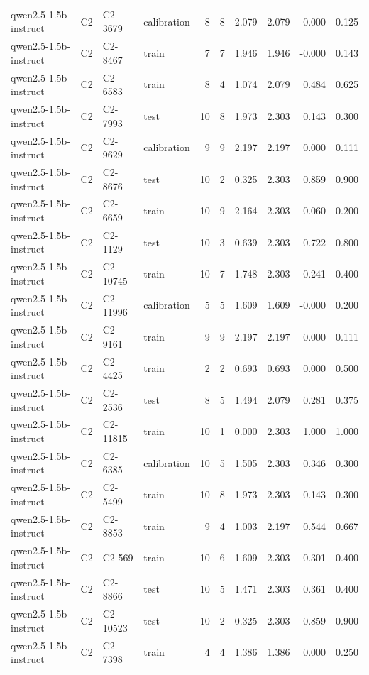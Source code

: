 \begin{table}
\begin{tabular}{llllrrrrrr}
qwen2.5-1.5b-instruct & C2 & C2-3679 & calibration & 8 & 8 & 2.079 & 2.079 & 0.000 & 0.125 \\
qwen2.5-1.5b-instruct & C2 & C2-8467 & train & 7 & 7 & 1.946 & 1.946 & -0.000 & 0.143 \\
qwen2.5-1.5b-instruct & C2 & C2-6583 & train & 8 & 4 & 1.074 & 2.079 & 0.484 & 0.625 \\
qwen2.5-1.5b-instruct & C2 & C2-7993 & test & 10 & 8 & 1.973 & 2.303 & 0.143 & 0.300 \\
qwen2.5-1.5b-instruct & C2 & C2-9629 & calibration & 9 & 9 & 2.197 & 2.197 & 0.000 & 0.111 \\
qwen2.5-1.5b-instruct & C2 & C2-8676 & test & 10 & 2 & 0.325 & 2.303 & 0.859 & 0.900 \\
qwen2.5-1.5b-instruct & C2 & C2-6659 & train & 10 & 9 & 2.164 & 2.303 & 0.060 & 0.200 \\
qwen2.5-1.5b-instruct & C2 & C2-1129 & test & 10 & 3 & 0.639 & 2.303 & 0.722 & 0.800 \\
qwen2.5-1.5b-instruct & C2 & C2-10745 & train & 10 & 7 & 1.748 & 2.303 & 0.241 & 0.400 \\
qwen2.5-1.5b-instruct & C2 & C2-11996 & calibration & 5 & 5 & 1.609 & 1.609 & -0.000 & 0.200 \\
qwen2.5-1.5b-instruct & C2 & C2-9161 & train & 9 & 9 & 2.197 & 2.197 & 0.000 & 0.111 \\
qwen2.5-1.5b-instruct & C2 & C2-4425 & train & 2 & 2 & 0.693 & 0.693 & 0.000 & 0.500 \\
qwen2.5-1.5b-instruct & C2 & C2-2536 & test & 8 & 5 & 1.494 & 2.079 & 0.281 & 0.375 \\
qwen2.5-1.5b-instruct & C2 & C2-11815 & train & 10 & 1 & 0.000 & 2.303 & 1.000 & 1.000 \\
qwen2.5-1.5b-instruct & C2 & C2-6385 & calibration & 10 & 5 & 1.505 & 2.303 & 0.346 & 0.300 \\
qwen2.5-1.5b-instruct & C2 & C2-5499 & train & 10 & 8 & 1.973 & 2.303 & 0.143 & 0.300 \\
qwen2.5-1.5b-instruct & C2 & C2-8853 & train & 9 & 4 & 1.003 & 2.197 & 0.544 & 0.667 \\
qwen2.5-1.5b-instruct & C2 & C2-569 & train & 10 & 6 & 1.609 & 2.303 & 0.301 & 0.400 \\
qwen2.5-1.5b-instruct & C2 & C2-8866 & test & 10 & 5 & 1.471 & 2.303 & 0.361 & 0.400 \\
qwen2.5-1.5b-instruct & C2 & C2-10523 & test & 10 & 2 & 0.325 & 2.303 & 0.859 & 0.900 \\
qwen2.5-1.5b-instruct & C2 & C2-7398 & train & 4 & 4 & 1.386 & 1.386 & 0.000 & 0.250 \\

\end{tabular}
\end{table}
